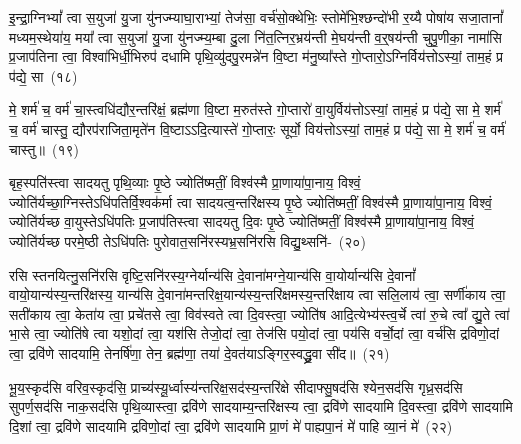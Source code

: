 {}%

इ॒न्द्रा॒ग्नि\-भ्यां᳚ त्वा स॒युजा॑ यु॒जा यु॑नज्म्याघा॒राभ्यां॒ तेज॑सा॒ वर्च॑सो॒क्थेभिः॒ स्तोमे॑भि॒श्छन्दो॑भी र॒य्यै पोषा॑य सजा॒तानां᳚ मध्यम॒स्थेया॑य॒ मया᳚ त्वा स॒युजा॑ यु॒जा यु॑नज्म्य॒म्बा दु॒ला नि॑त॒त्निर॒भ्रय॑न्ती मे॒घय॑न्ती व॒र्॒\mbox{}षय॑न्ती चुपु॒णीका॒ नामा॑सि प्र॒जा\-प॑तिना त्वा॒ विश्वा॑भिर्धी॒भिरुप॑ दधामि पृथि॒व्यु॑दपु॒रमन्ने॑न वि॒ष्टा म॑नु॒ष्या᳚स्ते गो॒प्तारो॒\-ऽग्निर्विय॑त्तो\-ऽस्यां॒ ताम॒हं प्र प॑द्ये॒ सा~(१८)

मे॒ शर्म॑ च॒ वर्म॑ चा॒स्त्वधि॑द्यौर॒न्तरि॑क्षं॒ ब्रह्म॑णा वि॒ष्टा म॒रुत॑स्ते गो॒प्तारो॑ वा॒युर्विय॑त्तो\-ऽस्यां॒ ताम॒हं प्र प॑द्ये॒ सा मे॒ शर्म॑ च॒ वर्म॑ चास्तु॒ द्यौरप॑राजिता॒मृते॑न वि॒ष्टा\-ऽ\-ऽ\-दि॒त्यास्ते॑ गो॒प्तारः॒ सूर्यो॒ विय॑त्तो\-ऽस्यां॒ ताम॒हं प्र प॑द्ये॒ सा मे॒ शर्म॑ च॒ वर्म॑ चास्तु॥~(१९)

{\anuvakamend[{सा\-ऽष्टाच॑त्वारिꣳशच्च}]}%

बृह॒स्पति॑स्त्वा सादयतु पृथि॒व्याः पृ॒ष्ठे ज्योति॑ष्मतीं॒ विश्व॑स्मै प्रा॒णाया॑पा॒नाय॒ विश्वं॒ ज्योति॑र्यच्छा॒ग्निस्ते\-ऽधि॑\-पतिर्वि॒श्वक॑र्मा त्वा सादयत्व॒न्त\-रि॑क्षस्य पृ॒ष्ठे ज्योति॑ष्मतीं॒ विश्व॑स्मै प्रा॒णाया॑पा॒नाय॒ विश्वं॒ ज्योति॑र्यच्छ वा॒युस्ते\-ऽधि॑\-पतिः प्र॒जा\-प॑तिस्त्वा सादयतु दि॒वः पृ॒ष्ठे ज्योति॑ष्मतीं॒ विश्व॑स्मै प्रा॒णाया॑पा॒नाय॒ विश्वं॒ ज्योति॑र्यच्छ परमे॒ष्ठी ते\-ऽधि॑\-पतिः पुरोवात॒सनि॑रस्यभ्र॒सनि॑रसि विद्यु॒थ्सनि॑-~(२०)

रसि स्तनयित्नु॒सनि॑रसि वृष्टि॒सनि॑रस्य॒ग्नेर्यान्य॑सि दे॒वाना॑\-मग्ने॒यान्य॑सि वा॒योर्यान्य॑सि दे॒वानां᳚ वायो॒यान्य॑स्य॒न्त\-रि॑क्षस्य॒ यान्य॑सि दे॒वाना॑\-मन्तरिक्ष॒यान्य॑स्य॒न्तरि॑क्षमस्य॒न्तरि॑क्षाय त्वा सलि॒लाय॑ त्वा॒ सर्णी॑काय त्वा॒ सती॑काय त्वा॒ केता॑य त्वा॒ प्रचे॑तसे त्वा॒ विव॑स्वते त्वा दि॒वस्त्वा॒ ज्योति॑ष आदि॒त्येभ्य॑स्त्व॒र्चे त्वा॑ रु॒चे त्वा᳚ द्यु॒ते त्वा॑ भा॒से त्वा॒ ज्योति॑षे त्वा यशो॒दां त्वा॒ यश॑सि तेजो॒दां त्वा॒ तेज॑सि पयो॒दां त्वा॒ पय॑सि वर्चो॒दां त्वा॒ वर्च॑सि द्रविणो॒दां त्वा॒ द्रवि॑णे सादयामि॒ तेनर्\mbox{}षि॑णा॒ तेन॒ ब्रह्म॑णा॒ तया॑ दे॒वत॑या\-ऽ\-ङ्गिर॒स्वद्ध्रु॒वा सी॑द॥~(२१)

{\anuvakamend[{वि॒द्यु॒थ्सनि॑र्द्यु॒त्वैका॒न्नत्रि॒ꣳ॒शच्च॑}]}%

भू॒य॒स्कृद॑सि वरिव॒स्कृद॑सि॒ प्राच्य॑स्यू॒र्ध्वास्य॑न्तरिक्ष॒सद॑स्य॒न्त\-रि॑क्षे सीदाफ्सु॒षद॑सि श्येन॒सद॑सि गृध्र॒सद॑सि सुपर्ण॒सद॑सि नाक॒सद॑सि पृथि॒व्यास्त्वा॒ द्रवि॑णे सादयाम्य॒न्त\-रि॑क्षस्य त्वा॒ द्रवि॑णे सादयामि दि॒वस्त्वा॒ द्रवि॑णे सादयामि दि॒शां त्वा॒ द्रवि॑णे सादयामि द्रविणो॒दां त्वा॒ द्रवि॑णे सादयामि प्रा॒णं मे॑ पाह्यपा॒नं मे॑ पाहि व्या॒नं मे॑~(२२)

